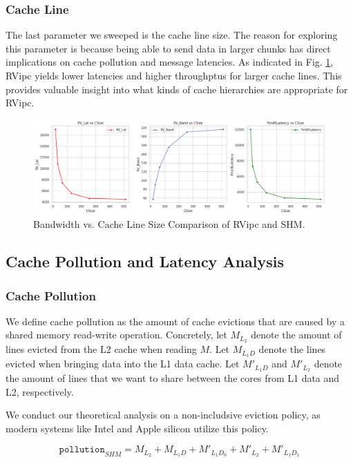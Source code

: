 \subsubsection{Cache Line}

The last parameter we sweeped is the cache line size. The reason for exploring this parameter is because being able to send data in larger chunks has direct implications on cache pollution and message latencies. As indicated in Fig. \ref{fig:cache_line}, RVipc yields lower latencies and higher throughptus for larger cache lines. This provides valuable insight into what kinds of cache hierarchies are appropriate for RVipc.

\begin{figure}[h]
  \centering
  \includegraphics[width=1\linewidth]{figures/band-v-linesz.png}
  \caption{Bandwidth vs. Cache Line Size Comparison of RVipc and SHM.}
  \label{fig:cache_line}
\end{figure}

\subsection{Cache Pollution and Latency Analysis}
\subsubsection{Cache Pollution}
We define cache pollution as the amount of cache evictions that are caused by a shared memory read-write operation. Concretely, let $M_{L_2}$ denote the amount of lines evicted from the L2 cache when reading $M$. Let $M_{L_1D}$ denote the lines evicted when bringing data into the L1 data cache. Let $M'_{L_1D}$ and $M'_{L_2}$ denote the amount of lines that we want to share between the cores from L1 data and L2, respectively.

We conduct our theoretical analysis on a non-includsive eviction policy, as modern systems like Intel and Apple silicon utilize this policy.

\begin{equation}
  \texttt{pollution}_{SHM} = M_{L_2} + M_{L_1D} + M'_{L_1D_0} + M'_{L_2} + M'_{L_1D_1}
\end{equation}

